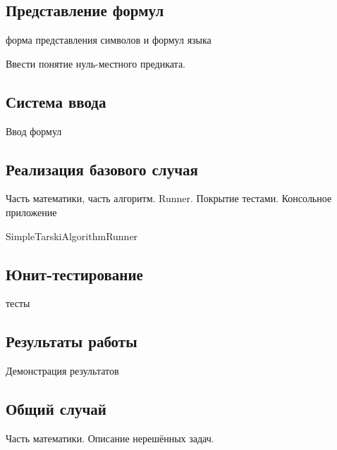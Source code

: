 \subsection{Представление формул}
форма представления символов и формул языка

Ввести понятие нуль-местного предиката.

\subsection{Система ввода}
Ввод формул

\subsection{Реализация базового случая}
Часть математики, часть алгоритм. Runner. Покрытие тестами. Консольное приложение

SimpleTarskiAlgorithmRunner

\subsection{Юнит-тестирование}
тесты

\subsection{Результаты работы}
Демонстрация результатов

\subsection{Общий случай}
Часть математики. Описание нерешённых задач.


